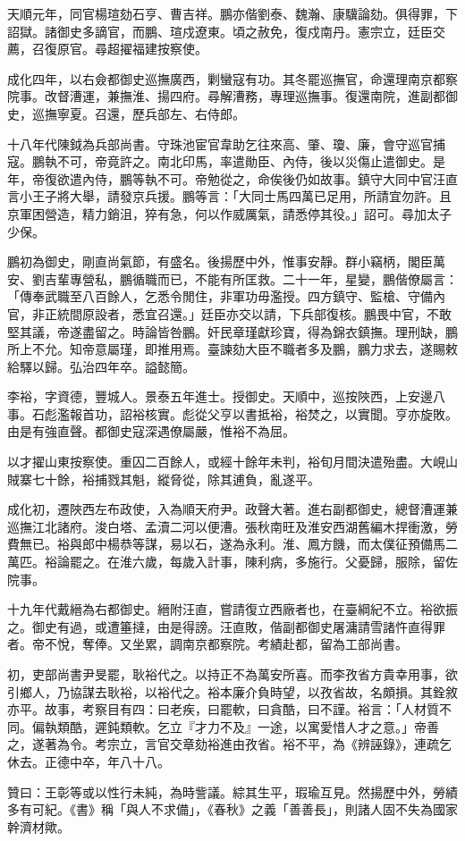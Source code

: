 \begin{pinyinscope}
天順元年，同官楊瑄劾石亨、曹吉祥。鵬亦偕劉泰、魏瀚、康驥論劾。俱得罪，下詔獄。諸御史多謫官，而鵬、瑄戍遼東。頃之赦免，復戍南丹。憲宗立，廷臣交薦，召復原官。尋超擢福建按察使。

成化四年，以右僉都御史巡撫廣西，剿蠻寇有功。其冬罷巡撫官，命還理南京都察院事。改督漕運，兼撫淮、揚四府。尋解漕務，專理巡撫事。復還南院，進副都御史，巡撫寧夏。召還，歷兵部左、右侍郎。

十八年代陳鉞為兵部尚書。守珠池宦官韋助乞往來高、肇、瓊、廉，會守巡官捕寇。鵬執不可，帝竟許之。南北印馬，率遣勛臣、內侍，後以災傷止遣御史。是年，帝復欲遣內侍，鵬等執不可。帝勉從之，命俟後仍如故事。鎮守大同中官汪直言小王子將大舉，請發京兵援。鵬等言：「大同士馬四萬已足用，所請宜勿許。且京軍困營造，精力銷沮，猝有急，何以作威厲氣，請悉停其役。」詔可。尋加太子少保。

鵬初為御史，剛直尚氣節，有盛名。後揚歷中外，惟事安靜。群小竊柄，閣臣萬安、劉吉輩專營私，鵬循職而已，不能有所匡救。二十一年，星變，鵬偕僚屬言：「傳奉武職至八百餘人，乞悉令閒住，非軍功毋濫授。四方鎮守、監槍、守備內官，非正統間原設者，悉宜召還。」廷臣亦交以請，下兵部復核。鵬畏中官，不敢堅其議，帝遂盡留之。時論皆咎鵬。奸民章瑾獻珍寶，得為錦衣鎮撫。理刑缺，鵬所上不允。知帝意屬瑾，即推用焉。臺諫劾大臣不職者多及鵬，鵬力求去，遂賜敕給驛以歸。弘治四年卒。謚懿簡。

李裕，字資德，豐城人。景泰五年進士。授御史。天順中，巡按陜西，上安邊八事。石彪濫報首功，詔裕核實。彪從父亨以書抵裕，裕焚之，以實聞。亨亦旋敗。由是有強直聲。都御史寇深遇僚屬嚴，惟裕不為屈。

以才擢山東按察使。重囚二百餘人，或經十餘年未判，裕旬月間決遣殆盡。大峴山賊寨七十餘，裕捕戮其魁，縱脅從，除其逋負，亂遂平。

成化初，遷陜西左布政使，入為順天府尹。政聲大著。進右副都御史，總督漕運兼巡撫江北諸府。浚白塔、孟瀆二河以便漕。張秋南旺及淮安西湖舊編木捍衝激，勞費無已。裕與郎中楊恭等謀，易以石，遂為永利。淮、鳳方饑，而太僕征預備馬二萬匹。裕論罷之。在淮六歲，每歲入計事，陳利病，多施行。父憂歸，服除，留佐院事。

十九年代戴縉為右都御史。縉附汪直，嘗請復立西廠者也，在臺綱紀不立。裕欲振之。御史有過，或遭箠撻，由是得謗。汪直敗，偕副都御史屠滽請雪諸忤直得罪者。帝不悅，奪俸。又坐累，調南京都察院。考績赴都，留為工部尚書。

初，吏部尚書尹旻罷，耿裕代之。以持正不為萬安所喜。而李孜省方貴幸用事，欲引鄉人，乃協謀去耿裕，以裕代之。裕本廉介負時望，以孜省故，名頗損。其銓敘亦平。故事，考察目有四：曰老疾，曰罷軟，曰貪酷，曰不謹。裕言：「人材質不同。偏執類酷，遲鈍類軟。乞立『才力不及』一途，以寓愛惜人才之意。」帝善之，遂著為令。考宗立，言官交章劾裕進由孜省。裕不平，為《辨誣錄》，連疏乞休去。正德中卒，年八十八。

贊曰：王彰等或以性行未純，為時訾議。綜其生平，瑕瑜互見。然揚歷中外，勞績多有可紀。《書》稱「與人不求備」，《春秋》之義「善善長」，則諸人固不失為國家幹濟材歟。


\end{pinyinscope}